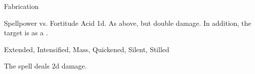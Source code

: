 \begin{spellsection}{Fabrication}
\begin{spellheader}
\end{spellheader}
\begin{spellcontent}
\begin{spelltargetinginfo}
\end{spelltargetinginfo}
\begin{spelleffects}
\begin{spellattack}{Spellpower vs. Fortitude}
\spellsuccess
Acid  \plus1d.
\spellcritical
As above, but double damage.
In addition, the target is  as a .
\end{spellattack}
\end{spelleffects}
\end{spellcontent}
\begin{spellfooter}
 Extended, Intensified, Mass, Quickened, Silent, Stilled
\end{spellfooter}
\begin{spellsubcontent}
\begin{spellcantrip}
The spell deals \minus2d damage.
\end{spellcantrip}
\end{spellsubcontent}
\end{spellsection}

